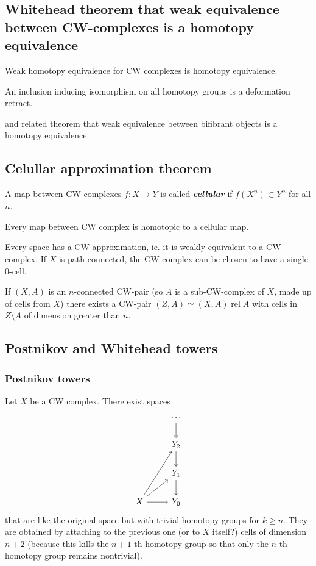 \begin{remark}
\subsection{Whitehead theorem that weak equivalence between CW-complexes is a homotopy equivalence}

\begin{thm}[Whitehead]
	Weak homotopy equivalence for CW complexes is homotopy equivalence.

	An inclusion inducing isomorphism on all homotopy groups is a deformation retract.
\end{thm}


and related theorem that weak equivalence between bifibrant objects is a homotopy equivalence.
\subsection{Celullar approximation theorem}

\begin{defn}
	A map between CW complexes $f:X\to Y$ is called \textit{\textbf{cellular}} if $f(X^{n})\subset Y^{n}$ for all $n$.
\end{defn}
\begin{thm}
	Every map between CW complex is homotopic to a cellular map.
\end{thm}
\begin{thm}[CW approximation]
	Every space has a CW approximation, ie. it is weakly equivalent to a CW-complex.	
	If $X$ is path-connected, the CW-complex can be chosen to have a single 0-cell.

	If $(X,A)$ is an $n$-connected CW-pair (so $A$ is a sub-CW-complex of $X$, made up of cells from $X$) there exists a CW-pair $(Z,A)\simeq (X,A)\operatorname{rel}A$ with cells in $Z\setminus A$ of dimension greater than $n$.
\end{thm}

\subsection{Postnikov and Whitehead towers}

\subsubsection{Postnikov towers}
Let $X$ be a CW complex. There exist spaces
\[\begin{tikzcd}
	&\cdots\arrow[d]\\
	&Y_{2}\arrow[d]\\
	&Y_{1}\arrow[d]\\
	X\arrow[uur]\arrow[ur]\arrow[r]&Y_{0}
\end{tikzcd}\]
that are like the original space but with trivial homotopy groups for $k\geq n$. They are obtained by attaching to the previous one {\color{blue}(or to $X$ itself?)} cells of dimension $n+2$ (because this kills the $n+1$-th homotopy group so that only the $n$-th homotopy group remains nontrivial).


\end{remark}
